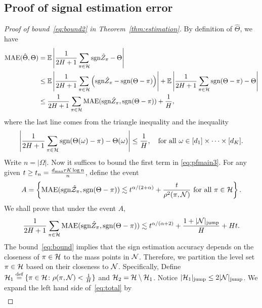 \documentclass[twoside,11pt]{article}
\theoremstyle{definition}
\def\sign{\textup{sgn}}
\begin{document}
\subsection{Proof of signal estimation error}\label{sec:proofsignal}
\begin{proof}[Proof of bound~\eqref{eq:bound2} in Theorem~\ref{thm:estimation}]
By definition of $\hat\Theta$, we have
\begin{align}\label{eq:pfmain3}\nonumber
\text{MAE}(\hat\Theta,\Theta) &= \mathbb{E}\left|\frac{1}{2H+1}\sum_{\pi\in\tH}\sign\hat Z_\pi-\Theta\right|\\\nonumber
&\leq \mathbb{E}\left|\frac{1}{2H+1}\sum_{\pi\in\tH}\left(\sign\hat Z_\pi-\sign(\Theta-\pi)\right)\right|+\mathbb{E}\left|\frac{1}{2H+1}\sum_{\pi\in\tH}\sign(\Theta-\pi)-\Theta\right|\\&
\leq \frac{1}{2H+1}\sum_{\pi\in\tH}\text{MAE}(\sign\hat Z_\pi,\sign(\Theta-\pi))+\frac{1}{H},
\end{align}
where the last line comes  from the triangle inequality and the inequality
\begin{equation}
\left|\frac{1}{2H+1}\sum_{\pi\in\tH}\sign(\Theta(\omega)-\pi)-\Theta(\omega)\right|\leq \frac{1}{H},\quad\text{for all } \omega\in[d_1]\times\cdots\times[d_K] .
\end{equation}
Write $n=|\Omega|$. Now it suffices to bound  the first term in \eqref{eq:pfmain3}.  
For any given $t\geq t_n={d_{\max}rK\log n \over n}$, define the event
\begin{align}
A = \left\{\text{MAE}(\sign \hat \tZ_\pi,\sign(\Theta-\pi))\lesssim t^{\alpha/(2+\alpha)}+ \frac{t}{\rho^2(\pi,\tN)}\text{ for all } \pi\in\tH\right\}.
\end{align}
We shall prove that under the event $A$,
\begin{equation}\label{eq:total}
{1\over 2H+1}\sum_{\pi \in \tH} \textup{MAE}(\sign \hat Z_\pi, \sign (\Theta-\pi)) \lesssim  t^{\alpha/(\alpha+2)}+{1+|\tN|_{\text{jump}}\over H}+ H t.
\end{equation}
The bound~\eqref{eq:bound} implies that the  sign estimation accuracy depends on the closeness of $\pi\in \mathcal{H}$ to the mass points in $\mathcal{N}$. Therefore, we partition the level set $\pi \in \mathcal{H}$ based on their closeness to $\mathcal{N}$. Specifically, Define $\mathcal{H}_1 \stackrel{\text{def}}{=}\{\pi\in\mathcal{H}\colon \rho(\pi,\mathcal{N})<\frac{1}{H}\}$ and $\mathcal{H}_2 = \mathcal{H}\setminus\mathcal{H}_1$.   Notice $|\mathcal{H}_1|_{\text{jump}}\leq 2|\mathcal{N}|_{\text{jump}}$.  We expand the left hand side of~\eqref{eq:total} by
\begin{align}\label{eq:twobounds}

\end{align}
\end{proof}
\end{document}
